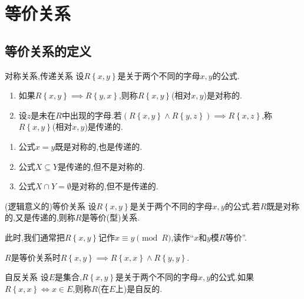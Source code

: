 \chapter{等价关系}

\section{等价关系的定义}

\begin{definition}{对称关系,传递关系}{}
	设$R\left\{x,y\right\}$是关于两个不同的字母$x,y$的公式.
	\begin{enumerate}
		\item 如果$R\left\{x,y\right\}\implies R\left\{y,x\right\}$,则称$R\left\{x,y\right\}$(相对$x,y$)是对称的.
		\item 设$z$是未在$R$中出现的字母.若$\left(R\left\{x,y\right\}\wedge R\left\{y,z\right\}\right)\implies R\left\{x,z\right\}$,称$R\left\{x,y\right\}$(相对$x,y$)是传递的.
	\end{enumerate}
\end{definition}

\begin{example}{}{}
	\begin{enumerate}
		\item 公式$x=y$既是对称的,也是传递的.
		\item 公式$X\subseteq Y$是传递的,但不是对称的.
		\item 公式$X\cap Y=\emptyset$是对称的,但不是传递的.
	\end{enumerate}
\end{example}

\begin{definition}{(逻辑意义的)等价关系}{}
	设$R\left\{x,y\right\}$是关于两个不同的字母$x,y$的公式.若$R$既是对称的,又是传递的,则称$R$是等价(型)关系.
	
	此时,我们通常把$R\left\{x,y\right\}$记作$x\equiv y\pmod{R}$,读作``$x$和$y$模$R$等价''.
\end{definition}

\begin{remark}{}{}
	$R$是等价关系时$R\left\{x,y\right\}\implies R\left\{x,x\right\}\wedge R\left\{y,y\right\}$.
\end{remark}

\begin{definition}{自反关系}{}
	设$E$是集合,$R\left\{x,y\right\}$是关于两个不同的字母$x,y$的公式.如果$R\left\{x,x\right\}\iff x\in E$,则称$R$(在$E$上)是自反的.
\end{definition}

